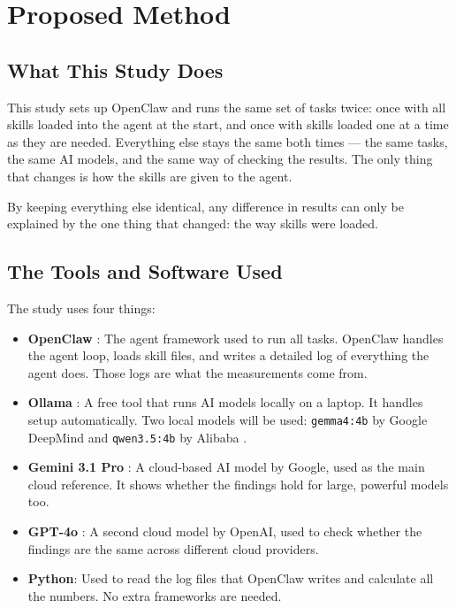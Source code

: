 \section{Proposed Method}
\label{sec:method}

\subsection{What This Study Does}

This study sets up OpenClaw \cite{openclaw_2025} and runs the same set of tasks twice: once with all skills loaded into the agent at the start, and once with skills loaded one at a time as they are needed. Everything else stays the same both times --- the same tasks, the same AI models, and the same way of checking the results. The only thing that changes is how the skills are given to the agent.

By keeping everything else identical, any difference in results can only be explained by the one thing that changed: the way skills were loaded.

\subsection{The Tools and Software Used}

The study uses four things:

\begin{itemize}
    \item \textbf{OpenClaw} \cite{openclaw_2025}: The agent framework used to run all tasks. OpenClaw handles the agent loop, loads skill files, and writes a detailed log of everything the agent does. Those logs are what the measurements come from.
    \item \textbf{Ollama} \cite{ollama_2024}: A free tool that runs AI models locally on a laptop. It handles setup automatically. Two local models will be used: \texttt{gemma4:4b} by Google DeepMind \cite{gemma4_2026} and \texttt{qwen3.5:4b} by Alibaba \cite{qwen3_2025}.
    \item \textbf{Gemini 3.1 Pro} \cite{google_gemini_2025}: A cloud-based AI model by Google, used as the main cloud reference. It shows whether the findings hold for large, powerful models too.
    \item \textbf{GPT-4o} \cite{openai_gpt4o_2024}: A second cloud model by OpenAI, used to check whether the findings are the same across different cloud providers.
    \item \textbf{Python}: Used to read the log files that OpenClaw writes and calculate all the numbers. No extra frameworks are needed.
\end{itemize}


